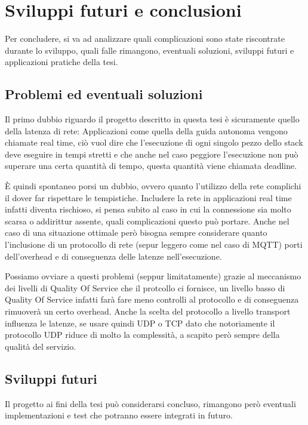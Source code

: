\section{Sviluppi futuri e conclusioni}
Per concludere, si va ad analizzare quali complicazioni sono state riscontrate durante lo sviluppo, quali falle rimangono, eventuali soluzioni, sviluppi futuri e applicazioni pratiche della tesi.

\subsection{Problemi ed eventuali soluzioni}
Il primo dubbio riguardo il progetto descritto in questa tesi è sicuramente quello della latenza di rete: Applicazioni come quella della guida autonoma vengono chiamate real time, ciò vuol dire che l'esecuzione di ogni singolo pezzo dello stack deve eseguire in tempi stretti e che anche nel caso peggiore l'esecuzione non può superare una certa quantità di tempo, questa quantità viene chiamata deadline.  

\noindent È quindi spontaneo porsi un dubbio, ovvero quanto l'utilizzo della rete complichi il dover far rispettare le tempistiche. Includere la rete in applicazioni real time infatti diventa rischioso, si pensa subito al caso in cui la connessione sia molto scarsa o addirittur assente, quali complicazioni questo può portare. Anche nel caso di una situazione ottimale però bisogna sempre considerare quanto l'inclusione di un protocollo di rete (sepur leggero come nel caso di MQTT) porti dell'overhead e di conseguenza delle latenze nell'esecuzione.

\noindent Possiamo ovviare a questi problemi (seppur limitatamente) grazie al meccanismo dei livelli di Quality Of Service che il protcollo ci fornisce, un livello basso di Quality Of Service infatti farà fare meno controlli al protocollo e di conseguenza rimuoverà un certo overhead. Anche la scelta del protocollo a livello transport influenza le latenze, se usare quindi UDP o TCP dato che notoriamente il protocollo UDP riduce di molto la complessità, a scapito però sempre della qualità del servizio.

\subsection{Sviluppi futuri}
Il progetto ai fini della tesi può considerarsi concluso, rimangono però eventuali implementazioni e test che potranno essere integrati in futuro.

